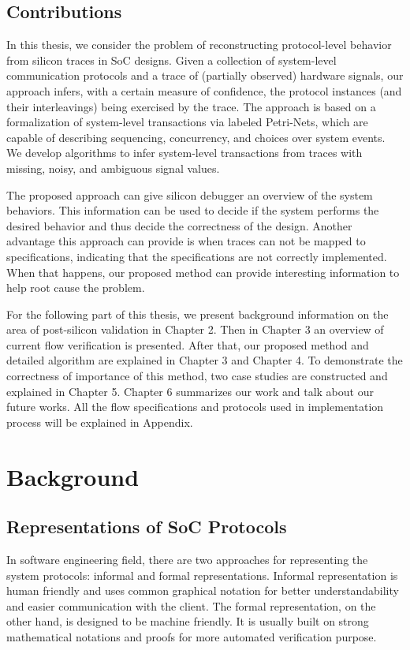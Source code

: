 \documentclass[12pt,frontmatter,copyright,thesis]{usfmanus}
\begin{document}
\section{Contributions}
In this thesis, we consider the problem of reconstructing
protocol-level behavior from silicon traces in SoC designs.
Given a collection of system-level communication protocols
and a trace of (partially observed) hardware signals, our
approach infers, with a certain measure of confidence, the
protocol instances (and their interleavings) being exercised
by the trace.  
The approach is based on a formalization of
system-level transactions via labeled Petri-Nets, which are
capable of describing sequencing, concurrency, and choices
over system events.  We develop algorithms to infer
system-level transactions from traces with missing, noisy,
and ambiguous signal values.

The proposed approach can give silicon debugger
an overview of the system behaviors.
This information can be used to decide
if the system performs the desired behavior and thus
decide the correctness of the design.
Another advantage this approach can provide 
is when traces can not be mapped to 
specifications, indicating that
the specifications are 
not correctly implemented.
When that happens, our proposed
method can provide interesting information
to help root cause the problem.


For the following part of this thesis, 
we present background information on the area of post-silicon validation in Chapter 2. 
Then in Chapter 3 an overview of current flow verification is presented. 
After that, our proposed method and detailed algorithm are explained in Chapter 3 and Chapter 4. 
To demonstrate the correctness of importance of this method, two case studies are constructed and explained
in Chapter 5.
Chapter 6 summarizes our work and talk about our future works. All the flow specifications and protocols used in implementation process will be explained in Appendix.


\chapter{Background}
 \section{Representations of SoC Protocols }
  
 In software engineering field, there are two approaches for representing the system protocols: informal
 and formal representations.
  Informal representation is human friendly and uses common 
  graphical notation for better understandability and easier communication with the client. 
The formal representation, on the other hand, is designed to be machine friendly.
It is usually built on strong mathematical notations and proofs for
more automated verification purpose.
\end{document}
